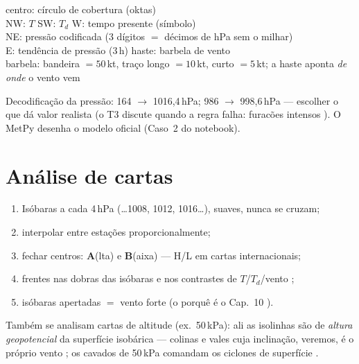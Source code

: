 \documentclass[11pt]{article}
\begin{document}
\begin{noquadro}
centro: círculo de cobertura (oktas)\\
NW: $T$ \quad SW: $T_d$ \quad W: tempo presente (símbolo)\\
NE: pressão codificada (3 dígitos $=$ décimos de hPa sem o milhar)\\
E: tendência de pressão (3\,h) \quad haste: barbela de vento\\[2pt]
barbela: bandeira $=50$\,kt, traço longo $=10$\,kt, curto $=5$\,kt;
a haste aponta \emph{de onde} o vento vem
\end{noquadro}

Decodificação da pressão: 164 $\to$ 1016{,}4\,hPa; 986 $\to$
998{,}6\,hPa — escolher o que dá valor realista (o T3 discute quando a
regra falha: furacões intensos ).
O MetPy desenha o modelo oficial (Caso~2 do notebook).

\section{Análise de cartas}\label{sec:analise}


\begin{formalivro}
\begin{enumerate}
  \item Isóbaras a cada 4\,hPa (\ldots 1008, 1012, 1016\ldots), suaves,
        nunca se cruzam;
  \item interpolar entre estações proporcionalmente;
  \item fechar centros: \textbf{A}(lta) e \textbf{B}(aixa) — H/L em
        cartas internacionais;
  \item frentes nas dobras das isóbaras e nos contrastes de
        $T$/$T_d$/vento ;
  \item isóbaras apertadas $=$ vento forte (o porquê é o
        Cap.~10 ).
\end{enumerate}
\end{formalivro}

Também se analisam cartas de altitude (ex.\ 50\,kPa): ali as isolinhas
são de \emph{altura geopotencial} da superfície isobárica — colinas e
vales cuja inclinação, veremos, é o próprio vento
; os cavados de 50\,kPa comandam os
ciclones de superfície .
\end{document}
